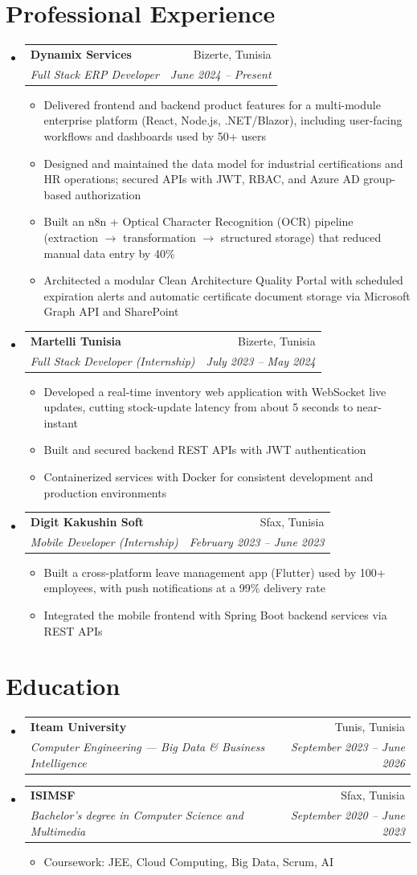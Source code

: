 \documentclass[letterpaper,11pt]{article}
\makeatletter
\newcommand{\resumeItem}[1]{
  \item\small{#1}
}
\newcommand{\resumeSubheading}[4]{
  \vspace{1pt}\item
    \begin{tabular*}{0.97\textwidth}[t]{l@{\extracolsep{\fill}}r}
      \textbf{#1} & #2 \\
      \textit{\small#3} & \textit{\small #4} \\
    \end{tabular*}\vspace{-2pt}
}
\newcommand{\resumeSubHeadingListStart}{\begin{itemize}[leftmargin=0.15in, label={}]}
\newcommand{\resumeSubHeadingListEnd}{\end{itemize}}
\newcommand{\resumeItemListStart}{\begin{itemize}[leftmargin=0.18in,itemsep=1pt]}
\newcommand{\resumeItemListEnd}{\end{itemize}\vspace{1pt}}
\makeatother
\begin{document}
\section{Professional Experience}
  \resumeSubHeadingListStart

    \resumeSubheading
      {Dynamix Services}{Bizerte, Tunisia}
      {Full Stack ERP Developer}{June 2024 -- Present}
      \resumeItemListStart
        \resumeItem{Delivered frontend and backend product features for a multi-module enterprise platform (React, Node.js, .NET/Blazor), including user-facing workflows and dashboards used by 50+ users}
        \resumeItem{Designed and maintained the data model for industrial certifications and HR operations; secured APIs with JWT, RBAC, and Azure AD group-based authorization}
        \resumeItem{Built an n8n + Optical Character Recognition (OCR) pipeline (extraction $\rightarrow$ transformation $\rightarrow$ structured storage) that reduced manual data entry by 40\%}
        \resumeItem{Architected a modular Clean Architecture Quality Portal with scheduled expiration alerts and automatic certificate document storage via Microsoft Graph API and SharePoint}
      \resumeItemListEnd

    \resumeSubheading
      {Martelli Tunisia}{Bizerte, Tunisia}
      {Full Stack Developer (Internship)}{July 2023 -- May 2024}
      \resumeItemListStart
        \resumeItem{Developed a real-time inventory web application with WebSocket live updates, cutting stock-update latency from about 5 seconds to near-instant}
        \resumeItem{Built and secured backend REST APIs with JWT authentication}
        \resumeItem{Containerized services with Docker for consistent development and production environments}
      \resumeItemListEnd

    \resumeSubheading
      {Digit Kakushin Soft}{Sfax, Tunisia}
      {Mobile Developer (Internship)}{February 2023 -- June 2023}
      \resumeItemListStart
        \resumeItem{Built a cross-platform leave management app (Flutter) used by 100+ employees, with push notifications at a 99\% delivery rate}
        \resumeItem{Integrated the mobile frontend with Spring Boot backend services via REST APIs}
      \resumeItemListEnd

  \resumeSubHeadingListEnd


\section{Education}
  \resumeSubHeadingListStart
    \resumeSubheading
      {Iteam University}{Tunis, Tunisia}
      {Computer Engineering --- Big Data \& Business Intelligence}{September 2023 -- June 2026}
    \resumeSubheading
      {ISIMSF}{Sfax, Tunisia}
      {Bachelor's degree in Computer Science and Multimedia}{September 2020 -- June 2023}
      \resumeItemListStart
        \resumeItem{Coursework: JEE, Cloud Computing, Big Data, Scrum, AI}
      \resumeItemListEnd
  \resumeSubHeadingListEnd
\end{document}
